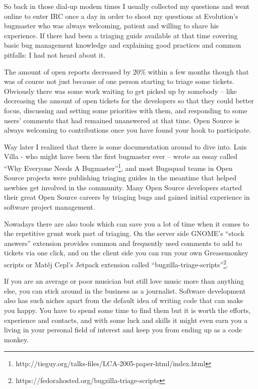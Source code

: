 So back in those dial-up modem times I usually collected my questions and went
online to enter IRC once a day in order to shoot my questions at Evolution's
bugmaster who was always welcoming, patient and willing to share his experience.
If there had been a triaging guide available at that time covering basic bug
management knowledge and explaining good practices and common pitfalls: I had
not heard about it.

The amount of open reports decreased by 20\% within a few months though that was
of course not just because of one person starting to triage some tickets.
Obviously there was some work waiting to get picked up by somebody -- like
decreasing the amount of open tickets for the developers so that they could
better focus, discussing and setting some priorities with them, and responding
to some users' comments that had remained unanswered at that time. Open Source
is always welcoming to contributions once you have found your hook to
participate.

Way later I realized that there is some documentation around to dive into. Luis
Villa - who might have been the first bugmaster ever -- wrote an essay called
``Why Everyone Needs A Bugmaster''\footnote{{
http://tieguy.org/talks-files/LCA-2005-paper-html/index.html}}, and most
Bugsquad teams in Open Source projects were publishing triaging guides in the
meantime that helped newbies get involved in the community. Many Open Source
developers started their great Open Source careers by triaging bugs and gained
initial experience in software project management.

Nowadays there are also tools which can save you a lot of time when it comes to
the repetitive grunt work part of triaging. On the server side GNOME's ``stock
answers'' extension provides common and frequently used comments to add to
tickets via one click, and on the client side you can run your own Greasemonkey
scripts or Matěj Cepl's Jetpack extension called
``bugzilla-triage-scripts''\footnote{{
https://fedorahosted.org/bugzilla-triage-scripts}}.

If you are an average or poor musician but still love music more than anything
else, you can stick around in the business as a journalist. Software development also has such niches apart from the default idea of writing code that can make you happy. You have to spend some time to find them but it is worth the efforts, experience and contacts, and with some luck and skills it might even earn you a living in your personal field of interest and keep you from ending up as a code monkey.
